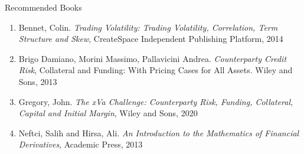 \documentclass{beamer}
\begin{document}
\begin{frame}{Recommended Books}
	\begin{enumerate}
		\item Bennet, Colin. \textit{Trading Volatility: Trading Volatility, Correlation, Term Structure and Skew}, CreateSpace Independent Publishing Platform, 2014
		\item Brigo Damiano, Morini Massimo, Pallavicini Andrea. \textit{Counterparty Credit Risk}, Collateral and Funding: With Pricing Cases for All Assets. Wiley and Sons, 2013
		\item Gregory, John. \textit{The xVa Challenge: Counterparty Risk, Funding, Collateral, Capital and Initial Margin}, Wiley and Sons, 2020
		\item Neftci, Salih and Hirsa, Ali. \textit{An Introduction to the Mathematics of Financial Derivatives}, Academic Press, 2013
	\end{enumerate}
\end{frame}

\end{document}
